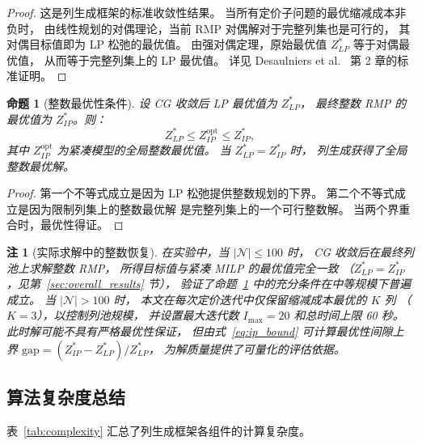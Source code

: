 \documentclass[UTF8, a4paper, 12pt]{ctexart}
\newtheorem{proposition}{命题}
\newtheorem{remark}{注}
\begin{document}
\begin{proof}
这是列生成框架的标准收敛性结果。
当所有定价子问题的最优缩减成本非负时，
由线性规划的对偶理论，当前 RMP 对偶解对于完整列集也是可行的，
其对偶目标值即为 LP 松弛的最优值。
由强对偶定理，原始最优值 $Z_{LP}^*$ 等于对偶最优值，
从而等于完整列集上的 LP 最优值。
详见 Desaulniers et al.~\cite{Desaulniers2005}
第 2 章的标准证明。
\end{proof}

\begin{proposition}[整数最优性条件]
\label{prop:integer}
设 CG 收敛后 LP 最优值为 $Z_{LP}^*$，
最终整数 RMP 的最优值为 $Z_{IP}^*$。则：
\begin{equation}
  Z_{LP}^* \le Z_{IP}^{\text{opt}} \le Z_{IP}^*,
  \label{eq:ip_bound}
\end{equation}
其中 $Z_{IP}^{\text{opt}}$ 为紧凑模型的全局整数最优值。
当 $Z_{LP}^* = Z_{IP}^*$ 时，
列生成获得了全局整数最优解。
\end{proposition}

\begin{proof}
第一个不等式成立是因为 LP 松弛提供整数规划的下界。
第二个不等式成立是因为限制列集上的整数最优解
是完整列集上的一个可行整数解。
当两个界重合时，最优性得证。
\end{proof}

\begin{remark}[实际求解中的整数恢复]
在实验中，当 $|\mathcal{N}| \le 100$ 时，
CG 收敛后在最终列池上求解整数 RMP，
所得目标值与紧凑 MILP 的最优值完全一致
（$Z_{LP}^* = Z_{IP}^*$，见第~\ref{sec:overall_results} 节），
验证了命题~\ref{prop:integer} 中的充分条件在中等规模下普遍成立。
当 $|\mathcal{N}| > 100$ 时，
本文在每次定价迭代中仅保留缩减成本最优的 $K$ 列
（$K = 3$），以控制列池规模，
并设置最大迭代数 $I_{\max} = 20$ 和总时间上限 60 秒。
此时解可能不具有严格最优性保证，
但由式~\eqref{eq:ip_bound} 可计算最优性间隙上界
$\text{gap} = (Z_{IP}^* - Z_{LP}^*) / Z_{LP}^*$，
为解质量提供了可量化的评估依据。
\end{remark}

\subsection{算法复杂度总结}
\label{sec:cg_complexity}

表~\ref{tab:complexity} 汇总了列生成框架各组件的计算复杂度。
\end{document}
